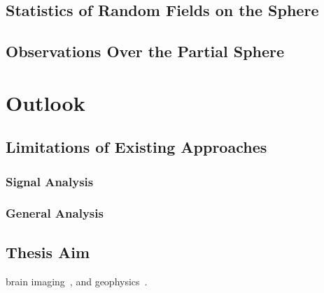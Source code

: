 



\subsection{Statistics of Random Fields on the Sphere}

\subsection{Observations Over the Partial Sphere}

\section{Outlook}\label{sec:chapter2_outlook}

\subsection{Limitations of Existing Approaches}

\subsubsection{Signal Analysis}

\subsubsection{General Analysis}

\subsection{Thesis Aim}

\eg{} brain imaging~\cite{Hammond2011}, and geophysics~\cite{Pavlis2013}.
